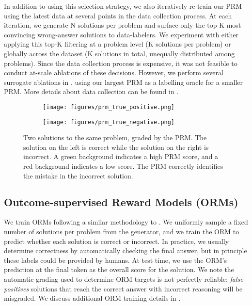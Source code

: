\documentclass{article}
\begin{document}
In addition to using this selection strategy, we also iteratively re-train our PRM using the latest data at several points in the data collection process. At each iteration, we generate N solutions per problem and surface only the top K most convincing wrong-answer solutions to data-labelers. We experiment with either applying this top-K filtering at a problem level (K solutions per problem) or globally across the dataset (K solutions in total, unequally distributed among problems). Since the data collection process is expensive, it was not feasible to conduct at-scale ablations of these decisions. However, we perform several surrogate ablations in , using our largest PRM as a labelling oracle for a smaller PRM. More details about data collection can be found in .

\begin{figure}
\centering
\begin{subfigure}[t]{0.49 \textwidth}
\vskip 0pt
\texttt{[image: figures/prm\_true\_positive.png]}
\end{subfigure}
\begin{subfigure}[t]{0.49 \textwidth}
\vskip 0pt
\texttt{[image: figures/prm\_true\_negative.png]}
\end{subfigure}
\caption{Two solutions to the same problem, graded by the PRM. The solution on the left is correct while the solution on the right is incorrect. A green background indicates a
high PRM score, and a red background indicates a low score. The PRM correctly identifies the mistake in the incorrect solution.}
\label{figure:prm_grading_examples}
\end{figure}

\subsection{Outcome-supervised Reward Models (ORMs)} \label{section:orm}

We train ORMs following a similar methodology to \cite{cobbe2021training}. We uniformly sample a fixed number of solutions per problem from the generator, and we train the ORM to predict whether each solution is correct or incorrect. In practice, we usually determine correctness by automatically checking the final answer, but in principle these labels could be provided by humans. At test time, we use the ORM's prediction at the final token as the overall score for the solution. We note the automatic grading used to determine ORM targets is not perfectly reliable: \textit{false positives} solutions that reach the correct answer with incorrect reasoning will be misgraded. We discuss additional ORM training details in .
\end{document}
